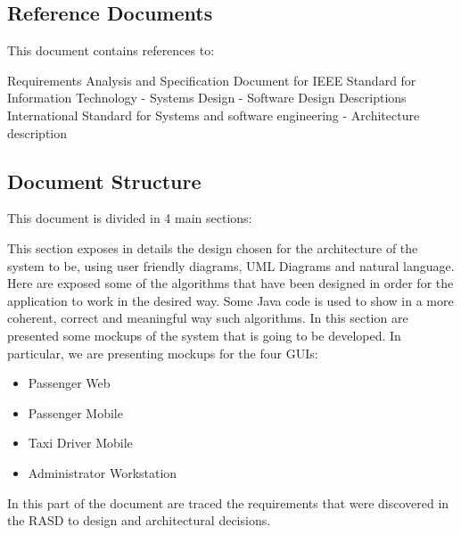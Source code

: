 \subsection{Reference Documents}
This document contains references to:
\begin{itemize}
	  Requirements Analysis and Specification Document for \myTaxiService{}
	 IEEE Standard for Information Technology - Systems Design - Software Design Descriptions
	 International Standard for Systems and software engineering - Architecture description
\end{itemize}

\subsection{Document Structure}
This document is divided in 4 main sections:
\begin{itemize}
	 This section exposes in details the design chosen for the architecture of the system to be, using user friendly diagrams, UML Diagrams and natural language.
	 Here are exposed some of the algorithms that have been designed in order for the application to work in the desired way. Some Java code is used to show in a more coherent, correct and meaningful way such algorithms.
	 In this section are presented some mockups of the system that is going to be developed. In particular, we are presenting mockups for the four GUIs:
	\begin{itemize}
		\item Passenger Web
		\item Passenger Mobile
		\item Taxi Driver Mobile
		\item Administrator Workstation
	\end{itemize}
	 In this part of the document are traced the requirements that were discovered in the RASD to design and architectural decisions.
\end{itemize}